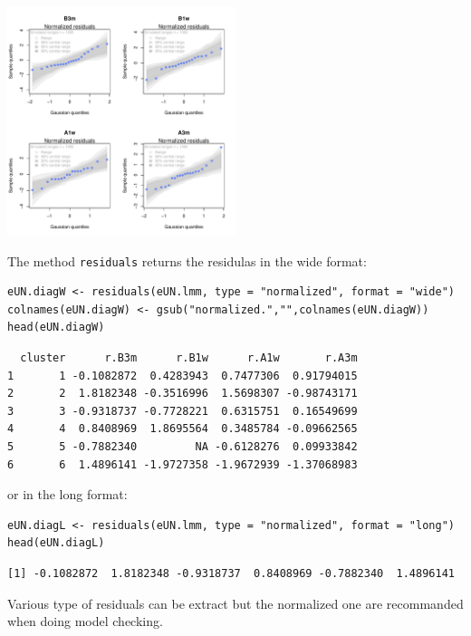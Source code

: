 \documentclass[12pt]{article}
\begin{document}
\begin{center}
\includegraphics[width=0.5\textwidth]{./figures/diag-qqplot.pdf}
\end{center}

\clearpage

The method \texttt{residuals} returns the residulas in the wide format:
\lstset{language=r,label= ,caption= ,captionpos=b,numbers=none}
\begin{lstlisting}
eUN.diagW <- residuals(eUN.lmm, type = "normalized", format = "wide")
colnames(eUN.diagW) <- gsub("normalized.","",colnames(eUN.diagW))
head(eUN.diagW)
\end{lstlisting}

\begin{verbatim}
  cluster      r.B3m      r.B1w      r.A1w       r.A3m
1       1 -0.1082872  0.4283943  0.7477306  0.91794015
2       2  1.8182348 -0.3516996  1.5698307 -0.98743171
3       3 -0.9318737 -0.7728221  0.6315751  0.16549699
4       4  0.8408969  1.8695564  0.3485784 -0.09662565
5       5 -0.7882340         NA -0.6128276  0.09933842
6       6  1.4896141 -1.9727358 -1.9672939 -1.37068983
\end{verbatim}


or in the long format:
\lstset{language=r,label= ,caption= ,captionpos=b,numbers=none}
\begin{lstlisting}
eUN.diagL <- residuals(eUN.lmm, type = "normalized", format = "long")
head(eUN.diagL)
\end{lstlisting}

\begin{verbatim}
[1] -0.1082872  1.8182348 -0.9318737  0.8408969 -0.7882340  1.4896141
\end{verbatim}


Various type of residuals can be extract but the normalized one are
recommanded when doing model checking.
\end{document}
